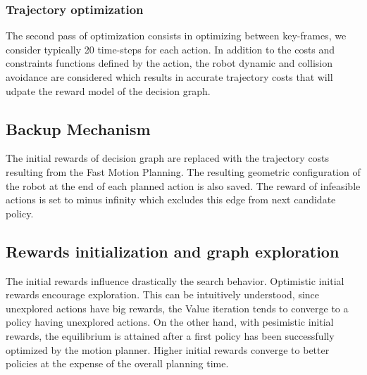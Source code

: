 \documentclass[conference]{IEEEtran}
\begin{document}
\subsubsection{Trajectory optimization}
The second pass of optimization consists in optimizing between key-frames, we consider typically 20 time-steps for each action. In addition to the costs and constraints functions defined by the action, the robot dynamic and collision avoidance are considered which results in accurate trajectory costs that will udpate the reward model of the decision graph.

\subsection{Backup Mechanism} \label{ssec:backup}
The initial rewards of decision graph are replaced with the trajectory costs resulting from the Fast Motion Planning. The resulting geometric configuration of the robot at the end of each planned action is also saved. The reward of infeasible actions is set to minus infinity which excludes this edge from next candidate policy. 
 
\subsection{Rewards initialization and graph exploration}\label{ssec:explo}
The initial rewards influence drastically the search behavior. Optimistic initial rewards encourage exploration. This can be intuitively understood, since unexplored actions have big rewards, the Value iteration tends to converge to a policy having unexplored actions. On the other hand, with pesimistic initial rewards, the equilibrium is attained after a first policy has been successfully optimized by the motion planner. Higher initial rewards converge to better policies at the expense of the overall planning time. 
 
\end{document}
